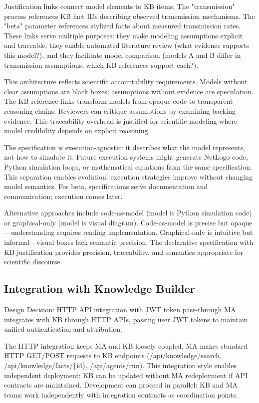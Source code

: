 \documentclass[12pt,a4paper]{article}
\begin{document}
Justification links connect model elements to KB items. The "transmission" process references KB fact IDs describing observed transmission mechanisms. The "beta" parameter references stylized facts about measured transmission rates. These links serve multiple purposes: they make modeling assumptions explicit and traceable, they enable automated literature review (what evidence supports this model?), and they facilitate model comparison (models A and B differ in transmission assumptions, which KB references support each?).

This architecture reflects scientific accountability requirements. Models without clear assumptions are black boxes; assumptions without evidence are speculation. The KB reference links transform models from opaque code to transparent reasoning chains. Reviewers can critique assumptions by examining backing evidence. This traceability overhead is justified for scientific modeling where model credibility depends on explicit reasoning.

The specification is execution-agnostic: it describes what the model represents, not how to simulate it. Future execution systems might generate NetLogo code, Python simulation loops, or mathematical equations from the same specification. This separation enables evolution: execution strategies improve without changing model semantics. For beta, specifications serve documentation and communication; execution comes later.

Alternative approaches include code-as-model (model is Python simulation code) or graphical-only (model is visual diagram). Code-as-model is precise but opaque—understanding requires reading implementation. Graphical-only is intuitive but informal—visual boxes lack semantic precision. The declarative specification with KB justification provides precision, traceability, and semantics appropriate for scientific discourse.

\subsection{Integration with Knowledge Builder}

\begin{rationale}{Design Decision: HTTP API integration with JWT token pass-through}
MA integrates with KB through HTTP APIs, passing user JWT tokens to maintain unified authentication and attribution.
\end{rationale}

The HTTP integration keeps MA and KB loosely coupled. MA makes standard HTTP GET/POST requests to KB endpoints (/api/knowledge/search, /api/knowledge/facts/\{id\}, /api/agents/run). This integration style enables independent deployment: KB can be updated without MA redeployment if API contracts are maintained. Development can proceed in parallel: KB and MA teams work independently with integration contracts as coordination points.
\end{document}
